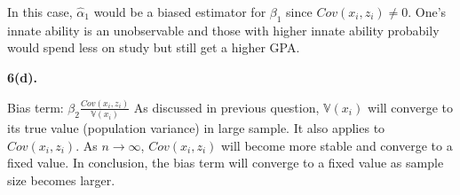 \documentclass[UTF8]{ctexart}
\begin{document}
In this case, $\hat{\alpha}_1$ would be a biased estimator for $\beta_1$ since 
$Cov(x_i,z_i) \neq 0$. One's innate ability is an unobservable and those with higher innate 
ability probabily would spend less on study but still get a higher GPA.
\par 

\textbf{6(d).}

Bias term: $\beta_2\frac{Cov(x_i,z_i)}{\mathbb{V}(x_i)}$
As discussed in previous question, $\mathbb{V}(x_i)$ will converge to 
its true value (population variance) in large sample. It also applies to $Cov(x_i,z_i)$. 
As $n \rightarrow \infty$, $Cov(x_i,z_i)$ will become more stable and converge to a fixed value. 
In conclusion, the bias term will converge to a fixed value as sample size becomes larger.
\end{document}
